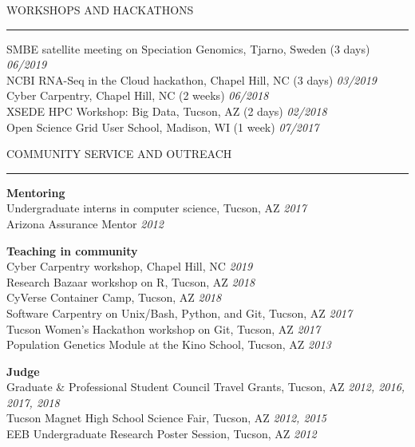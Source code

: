 \documentclass{resume} %
\renewenvironment{rSection}[1]{
\sectionskip
\textcolor{RoyalPurple}{\MakeUppercase{#1}}
\sectionlineskip
\hrule
\begin{list}{}{
\setlength{\leftmargin}{1.5em}
}
\item[]
}{
\end{list}
}
\begin{document}


\begin{rSection}{Workshops and Hackathons}

SMBE satellite meeting on Speciation Genomics, Tjarno, Sweden (3 days) \hfill{\em 06/2019}\\
NCBI RNA-Seq in the Cloud hackathon, Chapel Hill, NC (3 days) \hfill {\em 03/2019}\\
Cyber Carpentry, Chapel Hill, NC (2 weeks) \hfill {\em 06/2018}\\
XSEDE HPC Workshop: Big Data, Tucson, AZ (2 days) \hfill {\em 02/2018}\\
Open Science Grid User School, Madison, WI (1 week) \hfill {\em 07/2017}

\end{rSection}


\begin{rSection}{Community Service and Outreach}

\textbf{Mentoring}\\
Undergraduate interns in computer science, Tucson, AZ \hfill {\em 2017}\\
Arizona Assurance Mentor \hfill {\em 2012}

\textbf{Teaching in community}\\
Cyber Carpentry workshop, Chapel Hill, NC \hfill {\em 2019}\\
Research Bazaar workshop on R, Tucson, AZ \hfill {\em 2018}\\
CyVerse Container Camp, Tucson, AZ \hfill {\em 2018}\\
Software Carpentry on Unix/Bash, Python, and Git, Tucson, AZ \hfill {\em 2017}\\
Tucson Women’s Hackathon workshop on Git, Tucson, AZ \hfill {\em 2017}\\
Population Genetics Module at the Kino School, Tucson, AZ \hfill {\em 2013}

\textbf{Judge}\\
Graduate \& Professional Student Council Travel Grants, Tucson, AZ \hfill {\em 2012, 2016, 2017, 2018}\\
Tucson Magnet High School Science Fair, Tucson, AZ \hfill {\em 2012, 2015}\\
EEB Undergraduate Research Poster Session, Tucson, AZ \hfill {\em 2012}

\end{rSection}
\end{document}
